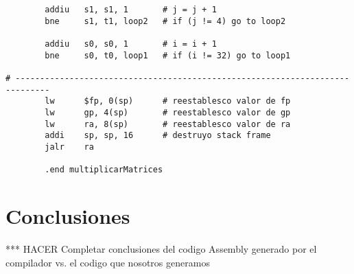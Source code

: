 \documentclass[a4paper,10pt]{article}
\begin{document}
\begin{lstlisting}
        addiu   s1, s1, 1       # j = j + 1
        bne     s1, t1, loop2   # if (j != 4) go to loop2

        addiu   s0, s0, 1       # i = i + 1
        bne     s0, t0, loop1   # if (i != 32) go to loop1

# -----------------------------------------------------------------------------
        lw      $fp, 0(sp)      # reestablesco valor de fp
        lw      gp, 4(sp)       # reestablesco valor de gp
        lw      ra, 8(sp)       # reestablesco valor de ra
        addi    sp, sp, 16      # destruyo stack frame
        jalr    ra

        .end multiplicarMatrices
\end{lstlisting}
\pagebreak

\section{Conclusiones}
*** HACER
Completar conclusiones del codigo Assembly generado por el compilador vs. el codigo que nosotros generamos
\end{document}
